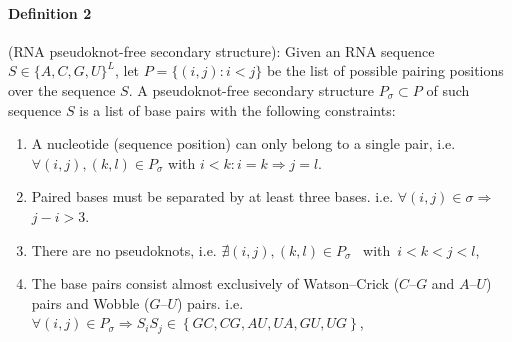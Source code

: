 \paragraph{\textbf{Definition 2} } (RNA pseudoknot-free secondary structure): Given an RNA sequence $S\in \{A,C,G,U\}^L$, let $P=\big \{(i,j) \colon i<j \big \}$ be the list of possible pairing positions over the sequence $S$. A pseudoknot-free secondary structure $P_{\sigma} \subset P $ of such sequence $S$ is a list of base pairs  with the following constraints:

\begin{enumerate}
	\item A nucleotide (sequence position) can only belong to a single pair, i.e. $\forall (i,j), (k,l) \in P_{\sigma}$ with $i<k \colon i=k \Rightarrow j=l$.
	\item Paired bases must be separated by at least three
	bases. i.e. \(\forall (i,j) \in \sigma \Rightarrow \) \(j-i>3\).
	\item There are no pseudoknots, i.e. $ \nexists \left(i,j\right), \left(k,l\right) \in P_{\sigma} $
	~with~\(i<k<j<l\),
	\item The base pairs consist almost exclusively of Watson–Crick ($C–G$ and $A–U$) pairs and Wobble ($G–U$) pairs. i.e. $\forall \left(i,j\right) \in P_{\sigma} \Rightarrow S_iS_j \in \left\{GC,CG,AU,UA,GU,UG\right\}$,

\end{enumerate}
